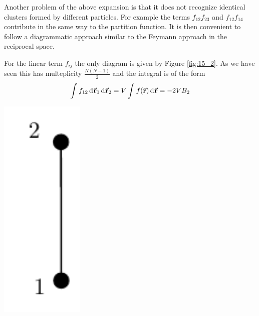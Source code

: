 \documentclass[../main/main.tex]{subfiles}
\begin{document}
Another problem of the above expansion is that it does not recognize identical clusters formed by different particles. For example the terms \( f_{12} f_{23} \) and \( f_{12}f_{14} \) contribute in the same way to the partition function. It is then convenient to follow a diagrammatic approach similar to the Feymann approach in the reciprocal space.

\begin{minipage}[c]{0.7\linewidth}
For the linear term \( f_{ij} \) the only diagram is given by Figure \ref{fig:15_2}. As we have seen this has multeplicity \( \frac{N(N-1)}{2} \) and the integral is of the form
\begin{equation}
  \int_{}^{}  f_{12} \dd[]{\va{r}_1} \dd[]{\va{r}_2}  = V \int_{}^{} f(\va{r}) \dd[]{\va{r}}  = - 2 V B_2
\end{equation}
\end{minipage}
\begin{minipage}[]{0.3\linewidth}
\centering
\includegraphics[width=0.3\textwidth]{../lessons/15_image/5.pdf}
\end{minipage}
\end{document}
